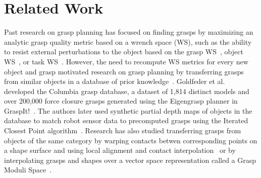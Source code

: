 \section{Related Work}

Past research on grasp planning has focused on finding grasps by maximizing an analytic grasp quality metric based on a wrench space (WS), such as the ability to resist external perturbations to the object based on the grasp WS~\cite{ferrari1992, ciocarlie2009}, object WS~\cite{liu2015fast}, or task WS~\cite{kruger2011partial}.
However, the need to recompute WS metrics for every new object and grasp motivated research on grasp planning by transferring grasps from similar objects in a database of prior knowledge~\cite{li2005shape}.
Goldfeder et al.~\cite{goldfeder2009columbia} developed the Columbia grasp database, a dataset of 1,814 distinct models and over 200,000 force closure grasps generated using the Eigengrasp planner in GraspIt!~\cite{ciocarlie2009}.
The authors later used synthetic partial depth maps of objects in the database to match robot sensor data to precomputed grasps using the Iterated Closest Point algorithm~\cite{goldfeder2011data}.
Research has also studied transferring grasps from objects of the same category by warping contacts betwen corresponding points on a shape surface and using local alignment and contact interpolation~\cite{stouraitis2015functional} or by interpolating grasps and shapes over a vector space representation called a Grasp Moduli Space~\cite{pokorny2013grasp}.

